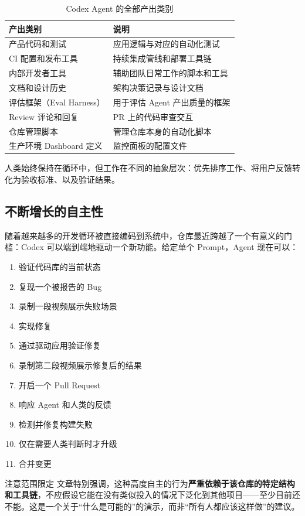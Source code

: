 \begin{table}[H]
\centering
\begin{tabular}{ll}
\toprule
\textbf{产出类别} & \textbf{说明} \\
\midrule
产品代码和测试 & 应用逻辑与对应的自动化测试 \\
CI 配置和发布工具 & 持续集成管线和部署工具链 \\
内部开发者工具 & 辅助团队日常工作的脚本和工具 \\
文档和设计历史 & 架构决策记录与设计文档 \\
评估框架（Eval Harness） & 用于评估 Agent 产出质量的框架 \\
Review 评论和回复 & PR 上的代码审查交互 \\
仓库管理脚本 & 管理仓库本身的自动化脚本 \\
生产环境 Dashboard 定义 & 监控面板的配置文件 \\
\bottomrule
\end{tabular}
\caption{Codex Agent 的全部产出类别}
\end{table}

人类始终保持在循环中，但工作在不同的抽象层次：优先排序工作、将用户反馈转化为验收标准、以及验证结果。

\subsection{不断增长的自主性}

随着越来越多的开发循环被直接编码到系统中，仓库最近跨越了一个有意义的门槛：Codex 可以端到端地驱动一个新功能。给定单个 Prompt，Agent 现在可以：

\begin{enumerate}[nosep]
  \item 验证代码库的当前状态
  \item 复现一个被报告的 Bug
  \item 录制一段视频展示失败场景
  \item 实现修复
  \item 通过驱动应用验证修复
  \item 录制第二段视频展示修复后的结果
  \item 开启一个 Pull Request
  \item 响应 Agent 和人类的反馈
  \item 检测并修复构建失败
  \item 仅在需要人类判断时才升级
  \item 合并变更
\end{enumerate}

\begin{knowledgebox}{注意范围限定}
文章特别强调，这种高度自主的行为\textbf{严重依赖于该仓库的特定结构和工具链}，不应假设它能在没有类似投入的情况下泛化到其他项目——至少目前还不能。这是一个关于``什么是可能的''的演示，而非``所有人都应该这样做''的建议。
\end{knowledgebox}

